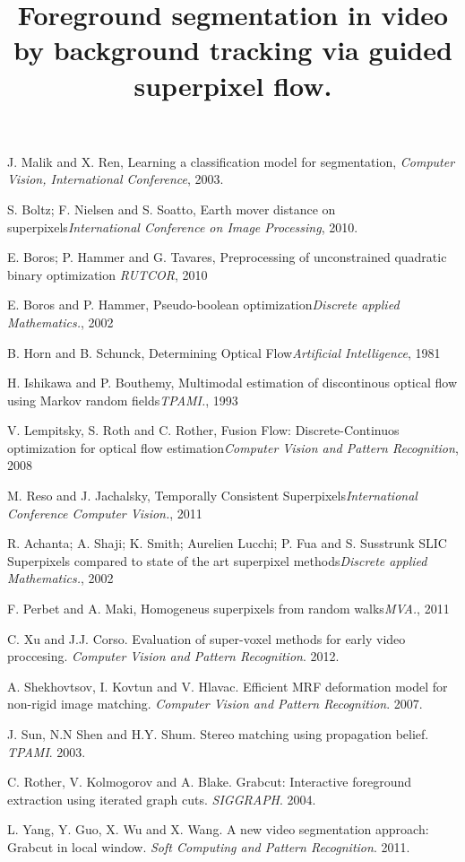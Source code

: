 \documentclass{bmvc2k}
\title{Foreground segmentation in video by background tracking via guided superpixel flow.}
\begin{document}
\maketitle





\begin{thebibliography}{99}

J. Malik and X. Ren, Learning a classification model for segmentation, {\it Computer Vision, International Conference}, 2003.

S. Boltz; F. Nielsen and S. Soatto, Earth mover distance on superpixels{\it International Conference on Image Processing}, 2010.

E. Boros; P. Hammer and G. Tavares, Preprocessing of unconstrained quadratic binary optimization {\it RUTCOR}, 2010

E. Boros and P. Hammer, Pseudo-boolean optimization{\it Discrete applied Mathematics.}, 2002

B. Horn and B. Schunck, Determining Optical Flow{\it Artificial Intelligence}, 1981

H. Ishikawa and P. Bouthemy, Multimodal estimation of discontinous optical flow using Markov random fields{\it TPAMI.}, 1993

V. Lempitsky, S. Roth and C. Rother, Fusion Flow: Discrete-Continuos optimization for optical flow estimation{\it Computer Vision and Pattern Recognition}, 2008

M. Reso and J. Jachalsky, Temporally Consistent Superpixels{\it International Conference Computer Vision.}, 2011

R. Achanta; A. Shaji; K. Smith; Aurelien Lucchi; P. Fua and S. Susstrunk SLIC Superpixels compared to state of the art superpixel methods{\it Discrete applied Mathematics.}, 2002

F. Perbet and A. Maki, Homogeneus superpixels from random walks{\it MVA.}, 2011

C. Xu and J.J. Corso. Evaluation of super-voxel methods for early video proccesing. {\it Computer Vision and Pattern Recognition}. 2012.

A. Shekhovtsov, I. Kovtun and V. Hlavac. Efficient MRF deformation model for non-rigid image matching. {\it Computer Vision and Pattern Recognition}. 2007.

J. Sun, N.N Shen and H.Y. Shum. Stereo matching using propagation belief. {\it TPAMI}. 2003.

C. Rother, V. Kolmogorov and A. Blake. Grabcut: Interactive foreground extraction using iterated graph cuts. {\it SIGGRAPH}. 2004.

L. Yang, Y. Guo, X. Wu and X. Wang. A new video segmentation approach: Grabcut in local window. {\it Soft Computing and Pattern Recognition}. 2011.

\end{thebibliography}
\end{document}
